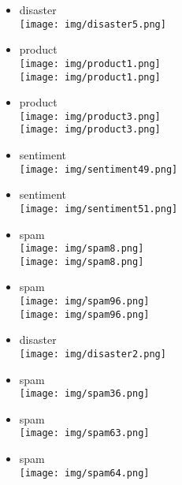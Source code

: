 \documentclass{article}
\theoremstyle{definition}
\theoremstyle{remark}
\begin{document}
\begin{landscape}
\begin{itemize}
    \item disaster\\\texttt{[image: img/disaster5.png]}
    \item product\\\texttt{[image: img/product1.png]}\\
        \texttt{[image: img/product1.png]}\\
    \item product\\\texttt{[image: img/product3.png]}\\
        \texttt{[image: img/product3.png]}
    \item sentiment\\\texttt{[image: img/sentiment49.png]}
    \item sentiment\\\texttt{[image: img/sentiment51.png]}
    \item spam\\\texttt{[image: img/spam8.png]}\\
        \texttt{[image: img/spam8.png]}
    \item spam\\\texttt{[image: img/spam96.png]}\\
        \texttt{[image: img/spam96.png]}
\end{itemize}

\newpage

\begin{itemize}
    \item disaster\\\texttt{[image: img/disaster2.png]}
    \item spam\\\texttt{[image: img/spam36.png]}
    \item spam\\\texttt{[image: img/spam63.png]}
    \item spam\\\texttt{[image: img/spam64.png]}
\end{itemize}


\end{landscape}
\end{document}
